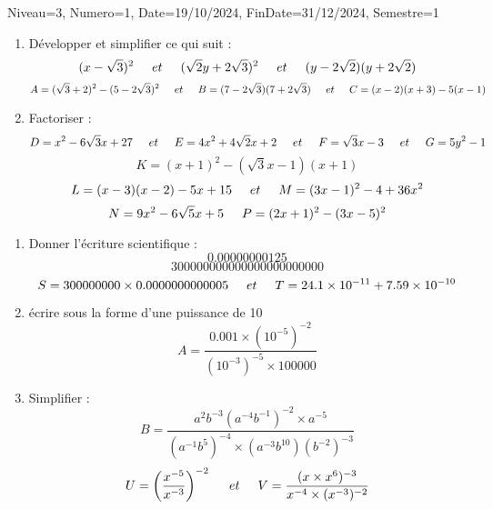 \documentclass[a4paper,12pt]{article}
\begin{document}
\begin{Maquette}[DM]{Niveau=3, Numero=1, Date=19/10/2024, FinDate=31/12/2024, Semestre=1}

\begin{exercice}
\begin{enumerate}
\item Développer et simplifier ce qui suit : 
\[ (x-\sqrt{3})^{2}\hspace*{0.5cm}et\hspace*{0.5cm}
	(\sqrt{2}y+2\sqrt{3})^{2}\hspace*{0.5cm}et\hspace*{0.5cm}
		(y-2\sqrt{2})(y+2\sqrt{2})\]
\[
A=(\sqrt{3}+2)^{2}-(5-2\sqrt{3})^{2}\hspace*{0.5 cm}et\hspace*{0.5 cm}
B=(7-2\sqrt{3})(7+2\sqrt{3})\hspace*{0.5 cm}et\hspace*{0.5 cm}
C=(x-2)(x+3)-5(x-1)
\]		
\item Factoriser :
\[ D=x^{2}-6\sqrt{3}x+27\hspace*{0.5cm}et\hspace*{0.5cm}
	E=4x^{2}+4\sqrt{2}x+2\hspace*{0.5cm}et\hspace*{0.5cm}
		F=\sqrt{3}x-3\hspace*{0.5cm}et\hspace*{0.5cm}
		G=5y^{2}-1\]
	\[K=(x+1)^{2}-(\sqrt{3}x-1)(x+1)\]
	\[
L=(x-3)(x-2)-5x+15\hspace*{0.5 cm}et\hspace*{0.5 cm}
M=(3x-1)^{2}-4+36x^{2}\]
\[N=9x^{2}-6\sqrt{5}x+5\hspace*{0.5 cm}
P=(2x+1)^{2}-(3x-5)^{2}
\]
\end{enumerate}
\end{exercice}

\begin{exercice}
\begin{enumerate}

\item Donner l'écriture scientifique :
\[0.00000000125 \]
\[300000000000000000000000 \]
\[
S=300000000 \times 0.0000000000005 \hspace*{0.5cm}et\hspace*{0.5cm}
T=24.1 \times 10^{-11}+ 7.59 \times 10^{-10}
\]
\item écrire sous la forme d'une puissance de 10
\[ A=\dfrac{0.001 \times (10^{-5})^{-2}}{(10^{-3})^{-5}\times 100000}\]
\item Simplifier :
\[ B=\dfrac{a^{2}b^{-3}(a^{-4}b^{-1})^{-2}\times a^{-5}}{(a^{-1}b^{5})^{-4}\times (a^{-3}b^{10})(b^{-2})^{-3}} \]
\[
U=\left( \dfrac{x^{-5}}{x^{-3}}\right)^{-2} \hspace*{0.5cm}et\hspace*{0.5cm}
V=\dfrac{(x \times x^{6})^{-3}}{x^{-4}\times (x^{-3})^{-2}}
\]
\end{enumerate}
\end{exercice}


\end{Maquette}
\end{document}
